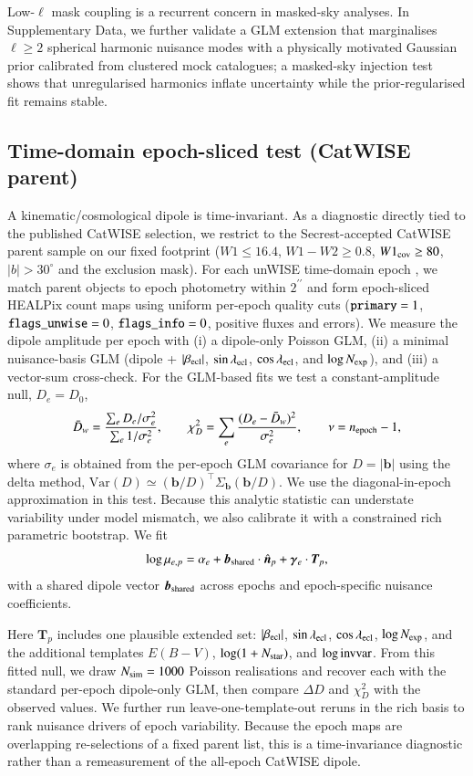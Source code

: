 \documentclass[fleqn,usenatbib]{mnras}
\begin{document}
Low-$\ell$ mask coupling is a recurrent concern in masked-sky analyses.
In Supplementary Data, we further validate a GLM extension that marginalises $\ell\ge2$ spherical harmonic nuisance modes with a physically motivated Gaussian prior calibrated from clustered mock catalogues; a masked-sky injection test shows that unregularised harmonics inflate uncertainty while the prior-regularised fit remains stable.

\subsection{Time-domain epoch-sliced test (CatWISE parent)}
A kinematic/cosmological dipole is time-invariant.
As a diagnostic directly tied to the published CatWISE selection, we restrict to the Secrest-accepted CatWISE parent sample on our fixed footprint ($W1\le16.4$, $W1-W2\ge0.8$, $W1_{\rm cov}\ge80$, $|b|>30^\circ$ and the exclusion mask).
For each unWISE time-domain epoch \citep{unwise_lang2014,unwise_meisner2017}, we match parent objects to epoch photometry within $2^{\prime\prime}$ and form epoch-sliced HEALPix count maps using uniform per-epoch quality cuts (${\tt primary}=1$, ${\tt flags\_unwise}=0$, ${\tt flags\_info}=0$, positive fluxes and errors).
We measure the dipole amplitude per epoch with (i) a dipole-only Poisson GLM, (ii) a minimal nuisance-basis GLM (dipole + $|\beta_{\rm ecl}|$, $\sin\lambda_{\rm ecl}$, $\cos\lambda_{\rm ecl}$, and $\log N_{\rm exp}$), and (iii) a vector-sum cross-check.
For the GLM-based fits we test a constant-amplitude null, $D_e=D_0$,
\begin{equation}
\bar D_w=\frac{\sum_e D_e/\sigma_e^2}{\sum_e 1/\sigma_e^2},\qquad
\chi^2_D=\sum_e\frac{(D_e-\bar D_w)^2}{\sigma_e^2},\qquad \nu=n_{\rm epoch}-1,
\end{equation}
where $\sigma_e$ is obtained from the per-epoch GLM covariance for $D=|\bm b|$ using the delta method,
$\mathrm{Var}(D)\simeq (\bm b/D)^\top \Sigma_{\bm b}(\bm b/D)$.
We use the diagonal-in-epoch approximation in this test.
Because this analytic statistic can understate variability under model mismatch, we also calibrate it with a constrained rich parametric bootstrap.
We fit
\begin{equation}
\log \mu_{e,p}=\alpha_e+\bm b_{\rm shared}\cdot\hat{\bm n}_p+\bm\gamma_e\cdot\bm T_p,
\end{equation}
with a shared dipole vector $\bm b_{\rm shared}$ across epochs and epoch-specific nuisance coefficients.

Here $\bm T_p$ includes one plausible extended set: $|\beta_{\rm ecl}|$, $\sin\lambda_{\rm ecl}$, $\cos\lambda_{\rm ecl}$, $\log N_{\rm exp}$, and the additional templates $E(B\!-\!V)$, $\log(1+N_{\rm star})$, and $\log{\rm invvar}$.
From this fitted null, we draw $N_{\rm sim}=1000$ Poisson realisations and recover each with the standard per-epoch dipole-only GLM, then compare $\Delta D$ and $\chi^2_D$ with the observed values.
We further run leave-one-template-out reruns in the rich basis to rank nuisance drivers of epoch variability.
Because the epoch maps are overlapping re-selections of a fixed parent list, this is a time-invariance diagnostic rather than a remeasurement of the all-epoch CatWISE dipole.
\end{document}
